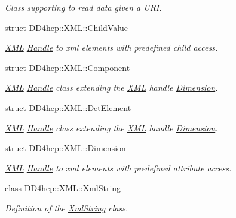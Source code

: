 \begin{DoxyCompactItemize}
\begin{DoxyCompactList}\small\item\em Class supporting to read data given a URI. \item\end{DoxyCompactList}\item 
struct \hyperlink{struct_d_d4hep_1_1_x_m_l_1_1_child_value}{DD4hep::XML::ChildValue}
\begin{DoxyCompactList}\small\item\em \hyperlink{namespace_d_d4hep_1_1_x_m_l}{XML} \hyperlink{class_d_d4hep_1_1_handle}{Handle} to xml elements with predefined child access. \item\end{DoxyCompactList}\item 
struct \hyperlink{struct_d_d4hep_1_1_x_m_l_1_1_component}{DD4hep::XML::Component}
\begin{DoxyCompactList}\small\item\em \hyperlink{namespace_d_d4hep_1_1_x_m_l}{XML} \hyperlink{class_d_d4hep_1_1_handle}{Handle} class extending the \hyperlink{namespace_d_d4hep_1_1_x_m_l}{XML} handle \hyperlink{struct_d_d4hep_1_1_x_m_l_1_1_dimension}{Dimension}. \item\end{DoxyCompactList}\item 
struct \hyperlink{struct_d_d4hep_1_1_x_m_l_1_1_det_element}{DD4hep::XML::DetElement}
\begin{DoxyCompactList}\small\item\em \hyperlink{namespace_d_d4hep_1_1_x_m_l}{XML} \hyperlink{class_d_d4hep_1_1_handle}{Handle} class extending the \hyperlink{namespace_d_d4hep_1_1_x_m_l}{XML} handle \hyperlink{struct_d_d4hep_1_1_x_m_l_1_1_dimension}{Dimension}. \item\end{DoxyCompactList}\item 
struct \hyperlink{struct_d_d4hep_1_1_x_m_l_1_1_dimension}{DD4hep::XML::Dimension}
\begin{DoxyCompactList}\small\item\em \hyperlink{namespace_d_d4hep_1_1_x_m_l}{XML} \hyperlink{class_d_d4hep_1_1_handle}{Handle} to xml elements with predefined attribute access. \item\end{DoxyCompactList}\item 
class \hyperlink{class_d_d4hep_1_1_x_m_l_1_1_xml_string}{DD4hep::XML::XmlString}
\begin{DoxyCompactList}\small\item\em Definition of the \hyperlink{class_d_d4hep_1_1_x_m_l_1_1_xml_string}{XmlString} class. \item\end{DoxyCompactList}\item 

\end{DoxyCompactItemize}
